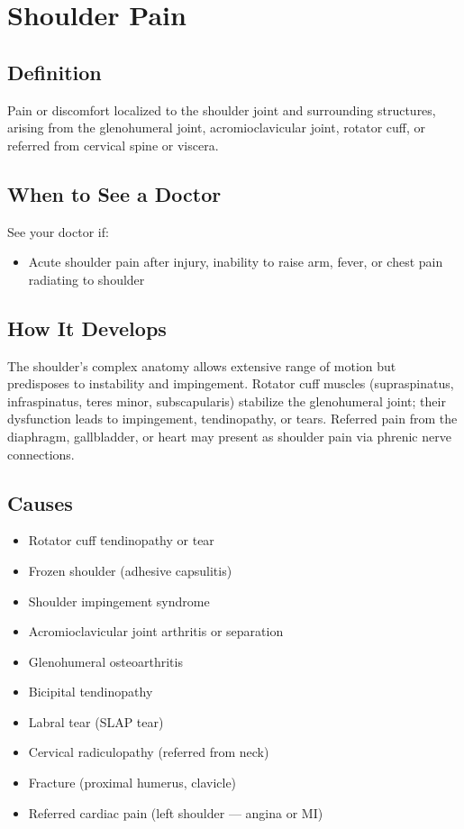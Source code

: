 \chapter{Shoulder Pain}

\section*{Definition}
Pain or discomfort localized to the shoulder joint and surrounding structures, arising from the glenohumeral joint, acromioclavicular joint, rotator cuff, or referred from cervical spine or viscera.

\section*{When to See a Doctor}
See your doctor if:
\begin{itemize}
  \item Acute shoulder pain after injury, inability to raise arm, fever, or chest pain radiating to shoulder
\end{itemize}

\section*{How It Develops}
The shoulder's complex anatomy allows extensive range of motion but predisposes to instability and impingement. Rotator cuff muscles (supraspinatus, infraspinatus, teres minor, subscapularis) stabilize the glenohumeral joint; their dysfunction leads to impingement, tendinopathy, or tears. Referred pain from the diaphragm, gallbladder, or heart may present as shoulder pain via phrenic nerve connections.

\section*{Causes}
\begin{itemize}
  \item Rotator cuff tendinopathy or tear
  \item Frozen shoulder (adhesive capsulitis)
  \item Shoulder impingement syndrome
  \item Acromioclavicular joint arthritis or separation
  \item Glenohumeral osteoarthritis
  \item Bicipital tendinopathy
  \item Labral tear (SLAP tear)
  \item Cervical radiculopathy (referred from neck)
  \item Fracture (proximal humerus, clavicle)
  \item Referred cardiac pain (left shoulder — angina or MI)
\end{itemize}

